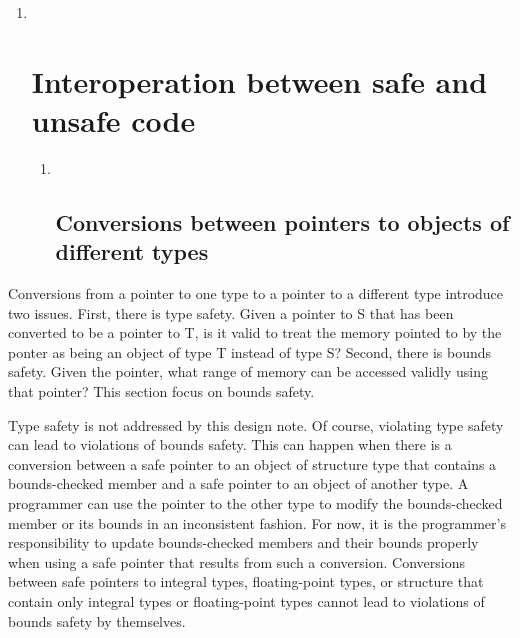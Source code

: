 \documentclass[]{article}
\begin{document}
\begin{enumerate}
\def\labelenumi{\arabic{enumi}.}
\item ~
  \section{\texorpdfstring{\protect\hypertarget{ux5fRef424916417}{}{\protect\hypertarget{ux5fToc426641108}{}{\protect\hypertarget{ux5fToc435434967}{}{\protect\hypertarget{ux5fToc437460795}{}{\protect\hypertarget{ux5fToc440445476}{}{\protect\hypertarget{ux5fToc440449258}{}{\protect\hypertarget{ux5fToc440551908}{}{\protect\hypertarget{ux5fToc422906961}{}{\protect\hypertarget{ux5fToc424307685}{}{\protect\hypertarget{ux5fRef424569596}{}{}}}}}}}}}}Interoperation
  between safe and unsafe
  code}{Interoperation between safe and unsafe code}}\label{interoperation-between-safe-and-unsafe-code}

  \begin{enumerate}
  \def\labelenumii{\arabic{enumii}.}
  \item ~
    \subsection{\texorpdfstring{\protect\hypertarget{ux5fToc422906963}{}{\protect\hypertarget{ux5fToc424307687}{}{\protect\hypertarget{ux5fToc426641110}{}{\protect\hypertarget{ux5fToc435434969}{}{\protect\hypertarget{ux5fToc437460796}{}{\protect\hypertarget{ux5fRef438042394}{}{\protect\hypertarget{ux5fToc440445477}{}{\protect\hypertarget{ux5fToc440449259}{}{\protect\hypertarget{ux5fToc440551909}{}{}}}}}}}}}Conversions
    between pointers to objects of different
    types}{Conversions between pointers to objects of different types}}\label{conversions-between-pointers-to-objects-of-different-types}
  \end{enumerate}
\end{enumerate}

Conversions from a pointer to one type to a pointer to a different type
introduce two issues. First, there is type safety. Given a pointer to S
that has been converted to be a pointer to T, is it valid to treat the
memory pointed to by the ponter as being an object of type T instead of
type S? Second, there is bounds safety. Given the pointer, what range of
memory can be accessed validly using that pointer? This section focus on
bounds safety.

Type safety is not addressed by this design note. Of course, violating
type safety can lead to violations of bounds safety. This can happen
when there is a conversion between a safe pointer to an object of
structure type that contains a bounds-checked member and a safe pointer
to an object of another type. A programmer can use the pointer to the
other type to modify the bounds-checked member or its bounds in an
inconsistent fashion. For now, it is the programmer's responsibility to
update bounds-checked members and their bounds properly when using a
safe pointer that results from such a conversion. Conversions between
safe pointers to integral types, floating-point types, or structure that
contain only integral types or floating-point types cannot lead to
violations of bounds safety by themselves.
\end{document}
